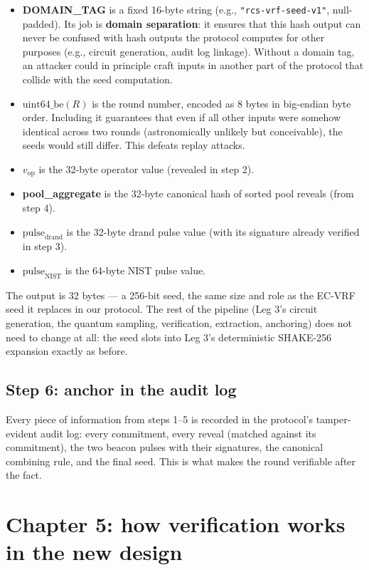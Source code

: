 \documentclass[11pt]{article}
\begin{document}
\begin{itemize}[leftmargin=2em, itemsep=4pt]
\item \textbf{DOMAIN\_TAG} is a fixed 16-byte string (e.g., \texttt{"rcs-vrf-seed-v1"}, null-padded). Its job is \textbf{domain separation}: it ensures that this hash output can never be confused with hash outputs the protocol computes for other purposes (e.g., circuit generation, audit log linkage). Without a domain tag, an attacker could in principle craft inputs in another part of the protocol that collide with the seed computation.
\item \textbf{$\text{uint64\_be}(R)$} is the round number, encoded as 8 bytes in big-endian byte order. Including it guarantees that even if all other inputs were somehow identical across two rounds (astronomically unlikely but conceivable), the seeds would still differ. This defeats replay attacks.
\item \textbf{$v_{\text{op}}$} is the 32-byte operator value (revealed in step 2).
\item \textbf{pool\_aggregate} is the 32-byte canonical hash of sorted pool reveals (from step 4).
\item \textbf{$\text{pulse}_{\text{drand}}$} is the 32-byte drand pulse value (with its signature already verified in step 3).
\item \textbf{$\text{pulse}_{\text{NIST}}$} is the 64-byte NIST pulse value.
\end{itemize}

The output is 32 bytes --- a 256-bit seed, the same size and role as the EC-VRF seed it replaces in our protocol. The rest of the pipeline (Leg 3's circuit generation, the quantum sampling, verification, extraction, anchoring) does not need to change at all: the seed slots into Leg 3's deterministic SHAKE-256 expansion exactly as before.

\subsection*{Step 6: anchor in the audit log}

Every piece of information from steps 1--5 is recorded in the protocol's tamper-evident audit log: every commitment, every reveal (matched against its commitment), the two beacon pulses with their signatures, the canonical combining rule, and the final seed. This is what makes the round verifiable after the fact.

\section{Chapter 5: how verification works in the new design}
\end{document}

